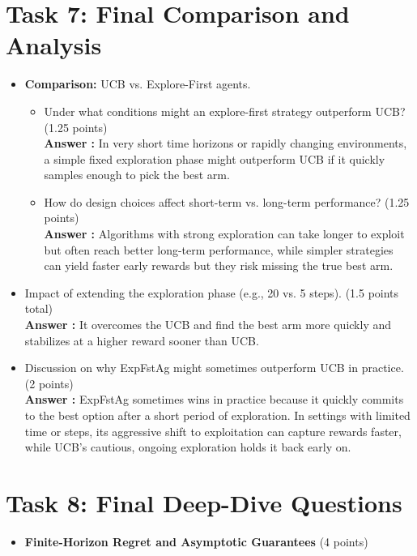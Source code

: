 \documentclass[12pt]{article}
\begin{document}
{{{\section{Task 7: Final Comparison and Analysis}
\begin{itemize}[noitemsep]
    \item \textbf{Comparison:} UCB vs. Explore-First agents.
    \begin{itemize}[noitemsep]
        \item Under what conditions might an explore-first strategy outperform UCB? (1.25 points)\\
        \textbf{Answer :} In very short time horizons or rapidly changing environments, a simple fixed exploration phase might outperform UCB if it quickly samples enough to pick the best arm.
        \item How do design choices affect short-term vs. long-term performance? (1.25 points)\\
        \textbf{Answer :} Algorithms with strong exploration can take longer to exploit but often reach better long-term performance, while simpler strategies can yield faster early rewards but they risk missing the true best arm.
    \end{itemize}
    \item Impact of extending the exploration phase (e.g., 20 vs. 5 steps). (1.5 points total)\\
    \textbf{Answer :} It overcomes the UCB and find the best arm more quickly and stabilizes at a higher reward sooner than UCB.
    \item Discussion on why ExpFstAg might sometimes outperform UCB in practice. (2 points)\\
    \textbf{Answer :} ExpFstAg sometimes wins in practice because it quickly commits to the best option after a short period of exploration. In settings with limited time or steps, its aggressive shift to exploitation can capture rewards faster, while UCB's cautious, ongoing exploration holds it back early on.
    
\end{itemize}

\section{Task 8: Final Deep-Dive Questions}
\begin{itemize}[noitemsep]
    \item \textbf{Finite-Horizon Regret and Asymptotic Guarantees} (4 points)
    

\end{itemize}}}}
\end{document}
